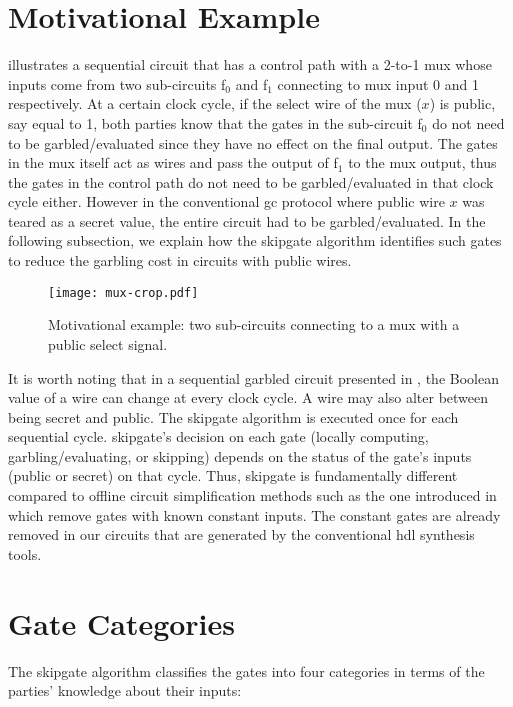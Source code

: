 \section{Motivational Example}\label{sec:skipgate-motiv}
 illustrates a sequential circuit that has a control path with a 2-to-1 \acrshort{mux} whose inputs come from two sub-circuits f$_0$ and f$_1$ connecting to \acrshort{mux} input 0 and 1 respectively.
At a certain clock cycle, if the select wire of the \acrshort{mux} ($x$) is public, say equal to 1, both parties know that the gates in the sub-circuit f$_0$ do not need to be garbled/evaluated since they have no effect on the final output.
The gates in the \acrshort{mux} itself act as wires and pass the output of f$_1$ to the \acrshort{mux} output, thus the gates in the control path do not need to be garbled/evaluated in that clock cycle either.
However in the conventional \acrshort{gc} protocol where public wire $x$ was teared as a secret value, the entire circuit had to be garbled/evaluated.
In the following subsection, we explain how the \gls{skipgate} algorithm identifies such gates to reduce the garbling cost in circuits with public wires.

\begin{figure}
    \centering
    \texttt{[image: mux-crop.pdf]}
    \caption{Motivational example: two sub-circuits connecting to a \acrshort{mux} with a public select signal.}
\label{fig:mux}
\end{figure}

It is worth noting that in a sequential garbled circuit presented in , the Boolean value of a wire can change at every clock cycle.
A wire may also alter between being secret and public.
The \gls{skipgate} algorithm is executed once for each sequential cycle.
\gls{skipgate}'s decision on each gate (locally computing, garbling/evaluating, or skipping) depends on the status of the gate's inputs (public or secret) on that cycle.
Thus, \gls{skipgate} is fundamentally different compared to offline circuit simplification methods such as the one introduced in~\cite{pinkas2009secure} which remove gates with known constant inputs.
The constant gates are already removed in our circuits that are generated by the conventional \acrshort{hdl} synthesis tools.

\section{Gate Categories}\label{sec:skipgate-cat}
The \gls{skipgate} algorithm classifies the gates into four categories in terms of the parties' knowledge about their inputs:

